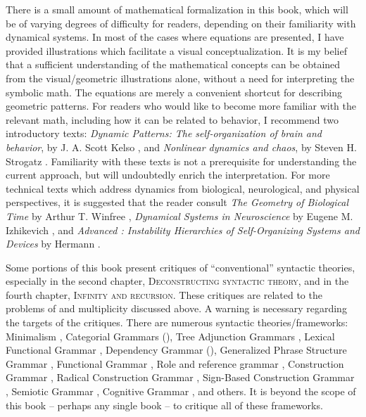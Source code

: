   There is a small amount of mathematical formalization in this book, which will be of varying degrees of difficulty for readers, depending on their familiarity with dynamical systems. In most of the cases where equations are presented, I have provided illustrations which facilitate a visual conceptualization. It is my belief that a sufficient understanding of the mathematical concepts can be obtained from the visual/geometric illustrations alone, without a need for interpreting the symbolic math. The equations are merely a convenient shortcut for describing geometric patterns. For readers who would like to become more familiar with the relevant math, including how it can be related to behavior, I recommend two introductory texts: \textit{Dynamic Patterns: The self-organization of brain and behavior}, by J. A. Scott Kelso \citep{Kelso1997}, and \textit{Nonlinear dynamics and chaos}, by Steven H. Strogatz \citep{Strogatz2018}. Familiarity with these texts is not a prerequisite for understanding the current approach, but will undoubtedly enrich the interpretation. For more technical texts which address dynamics from biological, neurological, and physical perspectives, it is suggested that the reader consult \textit{The Geometry of Biological Time} by Arthur T. Winfree \citep{Winfree2001}, \textit{Dynamical Systems in Neuroscience} by Eugene M. Izhikevich \citep{Izhikevich2007}, and \textit{Advanced : Instability Hierarchies of Self-Organizing Systems and Devices} by Hermann  \citep{Haken1983a}.

  Some portions of this book present critiques of “conventional” syntactic theories, especially in the second chapter, \textsc{Deconstructing syntactic theory,} and in the fourth chapter, \textsc{Infinity and recursion}. These critiques are related to the problems of  and multiplicity discussed above. A warning is necessary regarding the targets of the critiques. There are numerous syntactic theories/frameworks: 
  Minimalism \citep{Chomsky1995}, 
  Categorial Grammars (\citealt{Steedman1993,Wood2014}), 
  Tree Adjunction Grammars \citep{Joshi1987}, 
  Lexical Functional Grammar \citep{BresnanKaplan1982}, 
  Dependency Grammar (\citealt{Hudson1977,Tesnière2018}), 
  Generalized Phrase Structure Grammar 
  \citep{GazdarEtAl1985},
  Functional Grammar \citep{Dik1981}, 
  Role and reference grammar \citep{VanValinJr2014},
  Construction Grammar \citep{Goldberg1995}, 
  Radical Construction Grammar \citep{Croft2001}, 
  Sign-Based Construction Grammar \citep{Sag2012}, 
  Semiotic Grammar \citep{Mcgregor1997}, 
  Cognitive Grammar \citep{Langacker2008}, and others. It is beyond the scope of this book --  %
  perhaps any single book -- to critique all of these frameworks.

